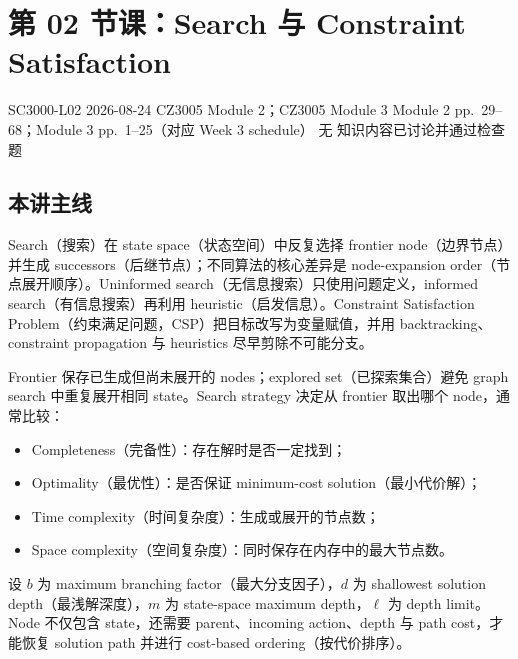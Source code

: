
\section{第 02 节课：Search 与 Constraint Satisfaction}
\label{lecture:SC3000-L02}

\lecturemeta
  {SC3000-L02}
  {2026-08-24}
  {CZ3005 Module 2；CZ3005 Module 3}
  {Module 2 pp.~29--68；Module 3 pp.~1--25（对应 Week 3 schedule）}
  {无}
  {知识内容已讨论并通过检查题}

\subsection{本讲主线}

Search（搜索）在 state space（状态空间）中反复选择 frontier node（边界节点）并生成 successors（后继节点）；不同算法的核心差异是 node-expansion order（节点展开顺序）。Uninformed search（无信息搜索）只使用问题定义，informed search（有信息搜索）再利用 heuristic（启发信息）。Constraint Satisfaction Problem（约束满足问题，CSP）把目标改写为变量赋值，并用 backtracking、constraint propagation 与 heuristics 尽早剪除不可能分支。


Frontier 保存已生成但尚未展开的 nodes；explored set（已探索集合）避免 graph search 中重复展开相同 state。Search strategy 决定从 frontier 取出哪个 node，通常比较：

\begin{itemize}
  \item Completeness（完备性）：存在解时是否一定找到；
  \item Optimality（最优性）：是否保证 minimum-cost solution（最小代价解）；
  \item Time complexity（时间复杂度）：生成或展开的节点数；
  \item Space complexity（空间复杂度）：同时保存在内存中的最大节点数。
\end{itemize}

设 $b$ 为 maximum branching factor（最大分支因子），$d$ 为 shallowest solution depth（最浅解深度），$m$ 为 state-space maximum depth，$\ell$ 为 depth limit。Node 不仅包含 state，还需要 parent、incoming action、depth 与 path cost，才能恢复 solution path 并进行 cost-based ordering（按代价排序）。

